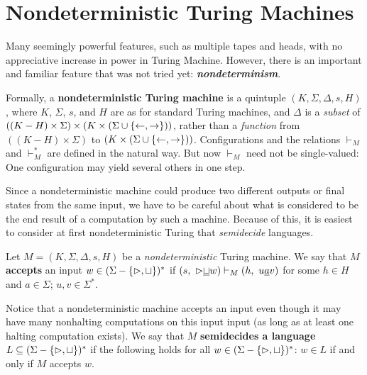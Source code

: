 \section{Nondeterministic Turing Machines}
\label{sec:nondeterministic-tm}

Many seemingly powerful features, such as multiple tapes and heads, with no appreciative increase in power in Turing Machine. However, there is an important and familiar feature that was not tried yet: \textit{\textbf{nondeterminism}}.

Formally, a \textbf{nondeterministic Turing machine} is a quintuple $(K, \Sigma, \Delta, s, H)$, where $K$, $\Sigma$, $s$, and $H$ are as for standard Turing machines, and $\Delta$ is a \textit{subset} of $((K - H) \times \Sigma) \times (K \times (\Sigma \cup \{ \leftarrow, \rightarrow \}))$, rather than a \textit{function} from $((K - H) \times \Sigma)$ to $(K \times (\Sigma \cup \{ \leftarrow, \rightarrow \}))$. Configurations and the relations $\vdash_M$ and $\vdash_M^*$ are defined in the natural way. But now $\vdash_M$ need not be single-valued: One configuration may yield several others in one step.

Since a nondeterministic machine could produce two different outputs or final states from the same input, we have to be careful about what is considered to be the end result of a computation by such a machine. Because of this, it is easiest to consider at first nondeterministic Turing that \textit{semidecide} languages.

\begin{definition}{}
Let $M = (K, \Sigma, \Delta, s, H)$ be a \textit{nondeterministic} Turing machine. We say that $M$ \textbf{accepts} an input $w \in (\Sigma - \{ \vartriangleright, \sqcup \})^*$ if $(s,\ {\tar}{\underline{\blank}}w) \vdash_M (h,\ u\underline{a}v)$ for some $h \in H$ and $a \in \Sigma$; $u, v \in \Sigma^*$.

\quad Notice that a nondeterministic machine accepts an input even though it may have many nonhalting computations on this input input (as long as at least one halting computation exists). We say that $M$ \textbf{semidecides a language} $L \subseteq (\Sigma - \{ \vartriangleright, \sqcup \})^*$ if the following holds for all $w \in (\Sigma - \{ \vartriangleright, \sqcup \})^*$: $w \in L$ if and only if $M$ accepts $w$. 
\end{definition}

